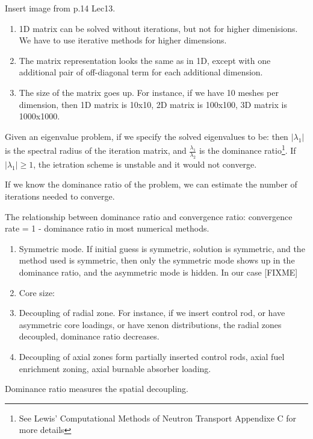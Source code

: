 \documentclass{school-22.211-notes}
\begin{document}
\clearpage
{}
Insert image from p.14 Lec13. 

\begin{enumerate}
\item 1D matrix can be solved without iterations, but not for higher dimenisions. We have to use iterative methods for higher dimensions. 
\item The matrix representation looks the same as in 1D, except with one additional pair of off-diagonal term for each additional dimension. 
\item The size of the matrix goes up. For instance, if we have 10 meshes per dimension, then 1D matrix is 10x10, 2D matrix is 100x100, 3D matrix is 1000x1000.
\end{enumerate}


\clearpage
{}
Given an eigenvalue problem, if we specify the solved eigenvalues to be:
then $|\lambda_1|$ is the spectral radius of the iteration matrix, and $\frac{\lambda_1}{\lambda_2}$ is the dominance ratio\footnote{See Lewis' Computational Methods of Neutron Transport Appendixe C for more details}. If $|\lambda_1| \ge 1$, the ietration scheme is unstable and it would not converge.  

If we know the dominance ratio of the problem, we can estimate the number of iterations needed to converge. 

The relationship between dominance ratio and convergence ratio: convergence rate = 1 - dominance ratio in most numerical methods. 
\begin{enumerate}
\item Symmetric mode. If initial guess is symmetric, solution is symmetric, and the method used is symmetric, then only the symmetric mode shows up in the dominance ratio, and the asymmetric mode is hidden. In our case  [FIXME]

\item Core size: 

\item Decoupling of radial zone. For instance, if we insert control rod, or have asymmetric core loadings, or have xenon distributions,  the radial zones decoupled, dominance ratio decreases. 

\item Decoupling of axial zones form partially inserted control rods, axial fuel enrichment zoning, axial burnable absorber loading. 
\end{enumerate}
Dominance ratio measures the spatial decoupling. 
\end{document}
